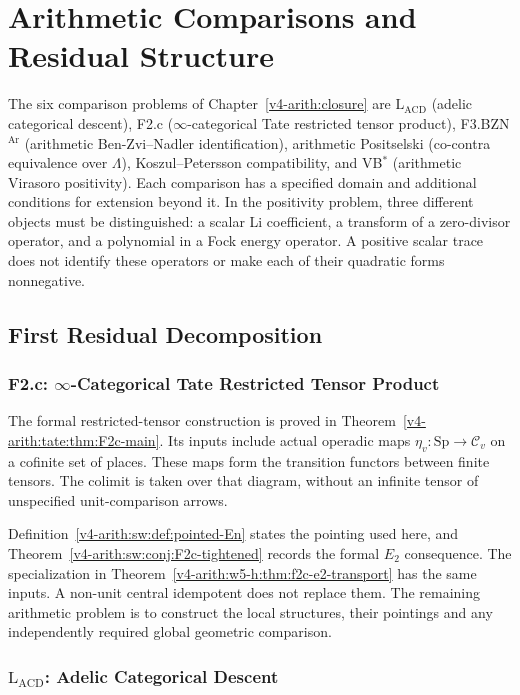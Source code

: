 \chapter{Arithmetic Comparisons and Residual Structure}
\label{v4-arith:comparison}

The six comparison problems of Chapter~\ref{v4-arith:closure} are
\(\mathrm{L}_{\mathrm{ACD}}\) (adelic categorical descent),
F2.c (\(\infty\)-categorical Tate restricted tensor product),
F3.BZN\(^{\mathrm{Ar}}\) (arithmetic Ben-Zvi--Nadler identification),
arithmetic Positselski (co-contra equivalence over \(\Lambda\)),
Koszul--Petersson compatibility, and
VB\(^{*}\) (arithmetic Virasoro positivity).
Each comparison has a specified domain and additional conditions for
extension beyond it. In the positivity problem, three different
objects must be distinguished: a scalar Li coefficient, a transform
of a zero-divisor operator, and a polynomial in a Fock energy operator.
A positive scalar trace does not identify these operators or make each
of their quadratic forms nonnegative.

\section{First Residual Decomposition}
\label{v4-arith:sw:table}

\subsection{F2.c: \texorpdfstring{\(\infty\)}{infinity}-Categorical Tate Restricted Tensor Product}

The formal restricted-tensor construction is proved in
Theorem~\ref{v4-arith:tate:thm:F2c-main}. Its inputs include actual
operadic maps \(\eta_v:\mathrm{Sp}\to\mathcal C_v\) on a cofinite
set of places. These maps form the transition functors between
finite tensors. The colimit is taken over that diagram, without
an infinite tensor of unspecified unit-comparison arrows.

Definition~\ref{v4-arith:sw:def:pointed-En} states the pointing
used here, and Theorem~\ref{v4-arith:sw:conj:F2c-tightened}
records the formal \(E_2\) consequence. The specialization in
Theorem~\ref{v4-arith:w5-h:thm:f2c-e2-transport} has the same
inputs. A non-unit central idempotent does not replace them.
The remaining arithmetic problem is to construct the local
structures, their pointings and any independently required
global geometric comparison.

\subsection{\texorpdfstring{\(\mathrm{L}_{\mathrm{ACD}}\)}{L-ACD}: Adelic Categorical Descent}

